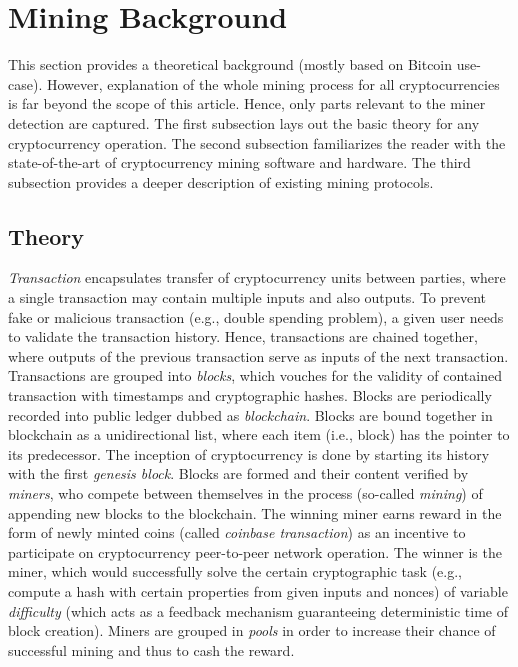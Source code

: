 \documentclass[preprint,12pt,3p]{elsarticle}
\begin{document}



\section{Mining Background}
\label{sec3}
This section provides a theoretical background (mostly based on Bitcoin use-case). However, explanation of the whole mining process for all cryptocurrencies is far beyond the scope of this article. Hence, only parts relevant to the miner detection are captured. The first subsection lays out the basic theory for any cryptocurrency operation. The second subsection familiarizes the reader with the state-of-the-art of cryptocurrency mining software and hardware. The third subsection provides a deeper description of existing mining protocols.

\subsection{Theory}
\label{subsec31}
\textit{Transaction} encapsulates transfer of cryptocurrency units between parties, where a single transaction may contain multiple inputs and also outputs. To prevent fake or malicious transaction (e.g., double spending problem), a given user needs to validate the transaction history. Hence, transactions are chained together, where outputs of the previous transaction serve as inputs of the next transaction. Transactions are grouped into \textit{blocks}, which vouches for the validity of contained transaction with timestamps and cryptographic hashes. Blocks are periodically recorded into public ledger dubbed as \textit{blockchain}. Blocks are bound together in blockchain as a unidirectional list, where each item (i.e., block) has the pointer to its predecessor. The inception of cryptocurrency is done by starting its history with the first \textit{genesis block}. Blocks are formed and their content verified by \textit{miners}, who compete between themselves in the process (so-called \textit{mining}) of appending new blocks to the blockchain. The winning miner earns reward in the form of newly minted coins (called \textit{coinbase transaction}) as an incentive to participate on cryptocurrency peer-to-peer network operation. The winner is the miner, which would successfully solve the certain cryptographic task (e.g., compute a hash with certain properties from given inputs and nonces) of variable \textit{difficulty} (which acts as a feedback mechanism guaranteeing deterministic time of block creation). Miners are grouped in \textit{pools} in order to increase their chance of successful mining and thus to cash the reward.
\end{document}
